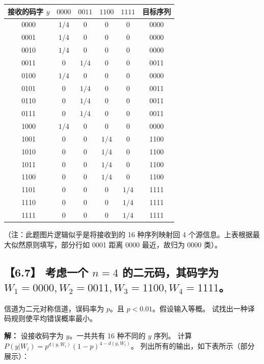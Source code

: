 \documentclass[11pt, a4paper]{article}
\begin{document}
\begin{table}[h]
\centering
\small
\begin{tabular}{|c|c|c|c|c|c|}
\hline
接收的码字 $y$ & $0000$ & $0011$ & $1100$ & $1111$ & 目标序列 \\
\hline
0000 & $1/4$ & 0 & 0 & 0 & 0000 \\
0001 & $1/4$ & 0 & 0 & 0 & 0000 \\
0010 & $1/4$ & 0 & 0 & 0 & 0000 \\
0011 & 0 & $1/4$ & 0 & 0 & 0011 \\
0100 & $1/4$ & 0 & 0 & 0 & 0000 \\
0101 & 0 & $1/4$ & 0 & 0 & 0011 \\
0110 & 0 & $1/4$ & 0 & 0 & 0011 \\
0111 & 0 & $1/4$ & 0 & 0 & 0011 \\
1000 & $1/4$ & 0 & 0 & 0 & 0000 \\
1001 & 0 & 0 & $1/4$ & 0 & 1100 \\
1010 & 0 & 0 & $1/4$ & 0 & 1100 \\
1011 & 0 & 0 & $1/4$ & 0 & 1100 \\
1100 & 0 & 0 & $1/4$ & 0 & 1100 \\
1101 & 0 & 0 & 0 & $1/4$ & 1111 \\
1110 & 0 & 0 & 0 & $1/4$ & 1111 \\
1111 & 0 & 0 & 0 & $1/4$ & 1111 \\
\hline
\end{tabular}
\end{table}
（注：此题图片逻辑似乎是将接收到的 16 种序列映射回 4 个源信息。上表根据最大似然原则填写，部分行如 0001 距离 0000 最近，故归为 0000 类）。

\subsection*{【6.7】 考虑一个 $n=4$ 的二元码，其码字为 $W_1=0000, W_2=0011, W_3=1100, W_4=1111$。}
信道为二元对称信道，误码率为 $p$。且 $p < 0.01$。假设输入等概。
试找出一种译码规则使平均错误概率最小。

\textbf{解：}
设接收码字为 $y$。一共共有 16 种不同的 $y$ 序列。
计算 $P(y|W_i) = p^{d(y, W_i)} (1-p)^{4-d(y, W_i)}$。
列出所有的输出，如下表所示（部分展示）：
\end{document}
